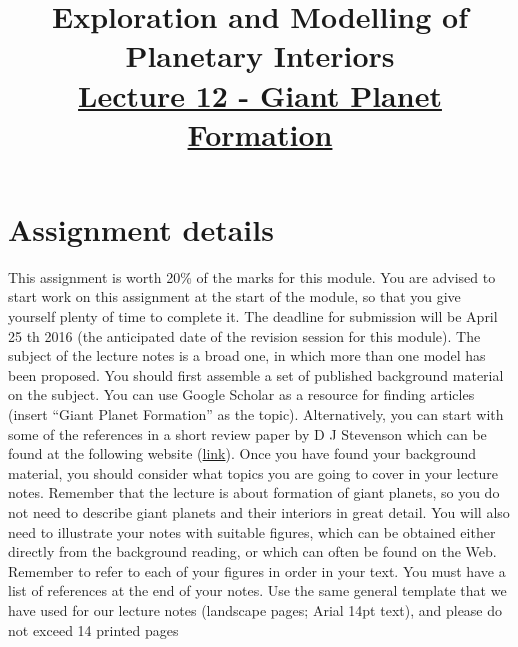 \documentclass[12pt]{article} %
\title{\large{\vspace{-5ex}\textbf{Exploration and Modelling of Planetary Interiors}}\newline\\{\textbf{\underline{Lecture 12 - Giant Planet Formation}}}\vspace{-7ex}}
\author{}
\date{} %
\begin{document}
\begingroup
\let\center\flushleft
\let\endcenter\endflushleft
\maketitle
\endgroup

\begingroup
\let\cleardoublepage\relax
\let\clearpage\relax
\tableofcontents
\endgroup

\section{Assignment details}\vspace{-2ex}\titlerule[1pt]\bigskip

This assignment is worth 20\% of the marks for this module. You are
advised to start work on this assignment at the start of the module, so
that you give yourself plenty of time to complete it. The deadline for
submission will be April 25 th 2016 (the anticipated date of the revision
session for this module).\newline\linebreak
The subject of the lecture notes is a broad one, in which more than one
model has been proposed. You should first assemble a set of published
background material on the subject. You can use Google Scholar as a
resource for finding articles (insert “Giant Planet Formation” as the
topic). Alternatively, you can start with some of the references in a short
review paper by D J Stevenson which can be found at the following
website (\href{http://authors.library.caltech.edu/9922/1/STEaipcp04.pdf}{link}).\newline \linebreak
Once you have found your background material, you should consider
what topics you are going to cover in your lecture notes. Remember that
the lecture is about formation of giant planets, so you do not need to
describe giant planets and their interiors in great detail. You will also
need to illustrate your notes with suitable figures, which can be obtained
either directly from the background reading, or which can often be found
on the Web. Remember to refer to each of your figures in order in your
text. You must have a list of references at the end of your notes.\newline\linebreak
Use the same general template that we have used for our lecture notes
(landscape pages; Arial 14pt text), and please do not exceed 14 printed
pages
\end{document}
